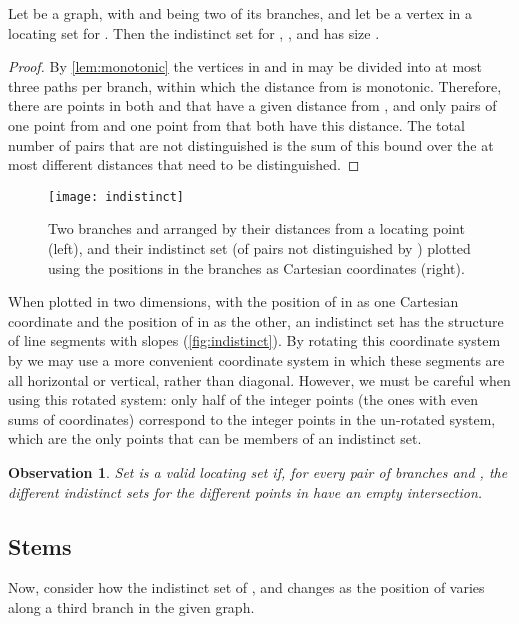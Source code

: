 \documentclass{jgaa-art}
\newtheorem{observation}{Observation}
\begin{document}
\begin{lemma}
Let  be a graph, with  and  being two of its branches, and let  be a vertex in a locating set for .
Then the indistinct set for , , and  has size  .
\end{lemma}

\begin{proof}
By \autoref{lem:monotonic} the vertices in  and in  may be divided into at most three paths per branch, within which the distance from  is monotonic.
Therefore, there are  points in both  and  that have a given distance  from ,
and only  pairs of one point from  and one point from  that both have this distance.
The total number of pairs that are not distinguished is the sum of this  bound over
the at most  different distances that need to be distinguished.
\end{proof}

\begin{figure}[t]
\centering\texttt{[image: indistinct]}
\caption{Two branches  and  arranged by their distances from a locating point  (left), and their indistinct set (of pairs not distinguished by ) plotted using the positions in the branches as Cartesian coordinates (right).}
\label{fig:indistinct}
\end{figure}

When plotted in two dimensions, with the position of  in  as one Cartesian coordinate and the position of  in  as the other, an indistinct set has the structure of  line segments with slopes  (\autoref{fig:indistinct}). By rotating this coordinate system by  we may use a more convenient coordinate system in which these segments are all horizontal or vertical, rather than diagonal. However, we must be careful when using this rotated system: only half of the integer points (the ones with even sums of coordinates) correspond to the integer points in the un-rotated system, which are the only points that can be members of an indistinct set.

\begin{observation}
Set  is a valid locating set if, for every pair of branches  and , the different indistinct sets for the different points in  have an empty intersection.
\end{observation}

\subsection{Stems}
Now, consider how the indistinct set of ,  and   changes as the position of  varies along a third branch  in the given graph.
\end{document}
